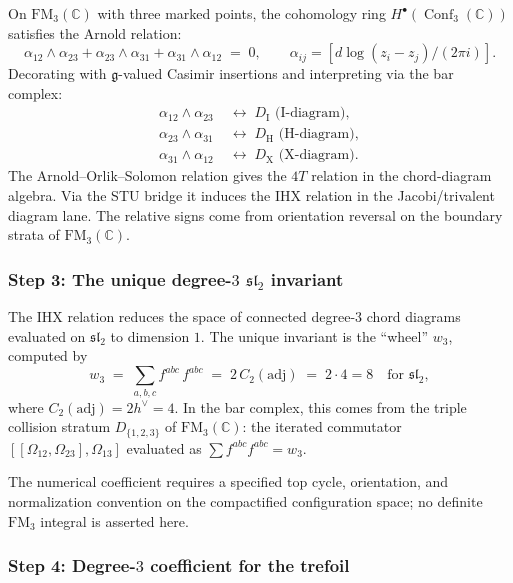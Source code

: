 \documentclass[11pt]{article}
\newcommand{\fg}{\mathfrak{g}}
\newcommand{\fsl}{\mathfrak{sl}}
\newcommand{\C}{\mathbb{C}}
\newcommand{\FM}{\mathrm{FM}}
\DeclareMathOperator{\Conf}{Conf}
\begin{document}
On $\FM_3(\C)$ with three marked points, the cohomology ring
$H^\bullet(\Conf_3(\C))$ satisfies the Arnold relation:
\[
  \alpha_{12} \wedge \alpha_{23}
  + \alpha_{23} \wedge \alpha_{31}
  + \alpha_{31} \wedge \alpha_{12}
  \;=\; 0,
  \qquad
  \alpha_{ij} = [d\log(z_i - z_j)/(2\pi i)].
\]
Decorating with $\fg$-valued Casimir insertions and
interpreting via the bar complex:
\begin{align*}
  \alpha_{12} \wedge \alpha_{23}
  &\;\longleftrightarrow\;
  D_{\mathrm{I}} \text{ (I-diagram)}, \\
  \alpha_{23} \wedge \alpha_{31}
  &\;\longleftrightarrow\;
  D_{\mathrm{H}} \text{ (H-diagram)}, \\
  \alpha_{31} \wedge \alpha_{12}
  &\;\longleftrightarrow\;
  D_{\mathrm{X}} \text{ (X-diagram)}.
\end{align*}
The Arnold--Orlik--Solomon relation gives the $4T$ relation in the
chord-diagram algebra.  Via the STU bridge it induces the IHX
relation in the Jacobi/trivalent diagram lane.  The relative signs
come from orientation reversal on the boundary strata of
$\FM_3(\C)$.

\subsubsection{Step 3: The unique degree-$3$ $\fsl_2$ invariant}

The IHX relation reduces the space of connected degree-$3$
chord diagrams evaluated on $\fsl_2$ to dimension $1$.
The unique invariant is the ``wheel'' $w_3$, computed by
\begin{equation}\label{eq:w3-computation}
  w_3
  \;=\;
  \sum_{a,b,c} f^{abc}\,f^{abc}
  \;=\;
  2\,C_2(\mathrm{adj})
  \;=\;
  2 \cdot 4 = 8
  \quad\text{for } \fsl_2,
\end{equation}
where $C_2(\mathrm{adj}) = 2h^\vee = 4$.  In the bar complex,
this comes from the triple collision stratum
$D_{\{1,2,3\}}$ of $\FM_3(\C)$: the iterated commutator
$[[\Omega_{12}, \Omega_{23}], \Omega_{13}]$ evaluated as
$\sum f^{abc}f^{abc} = w_3$.

The numerical coefficient requires a specified top cycle,
orientation, and normalization convention on the compactified
configuration space; no definite $\FM_3$ integral is asserted here.

\subsubsection{Step 4: Degree-$3$ coefficient for the trefoil}
\end{document}
